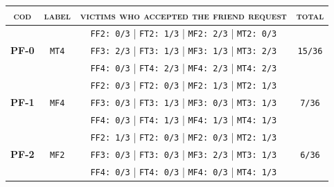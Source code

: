 \begin{table}[H]
	\begin{center}
		\begin{tabular}[c]{ |c|c|c|c|} 
			\hline
			\cellcolor[HTML]{b0d7ff}\textsc{cod} & 
			\cellcolor[HTML]{b0d7ff}\textsc{label}& 
			\cellcolor[HTML]{b0d7ff}\textsc{victims who accepted the friend request}&		
			\cellcolor[HTML]{b0d7ff}\textsc{total}\\
			\hline 
\multirow{3}{*}{\textbf{PF-0}} & \multirow{3}{*}{\texttt{MT4}}
&   \texttt{FF2: 0/3}  |  \texttt{FT2: 1/3}  |  \texttt{MF2: 2/3}  |  \texttt{MT2: 0/3} & \multirow{3}{*}{\texttt{15/36}} \\
& & \texttt{FF3: 2/3}  |  \texttt{FT3: 1/3}  |  \texttt{MF3: 1/3}  |  \texttt{MT3: 2/3} & \\
& & \texttt{FF4: 0/3}  |  \texttt{FT4: 2/3}  |  \texttt{MF4: 2/3}  |  \texttt{MT4: 2/3} & \\
\hline
\multirow{3}{*}{\textbf{PF-1}} & \multirow{3}{*}{\texttt{MF4}}
&   \texttt{FF2: 0/3}  |  \texttt{FT2: 0/3}  |  \texttt{MF2: 1/3}  |  \texttt{MT2: 1/3} & \multirow{3}{*}{\texttt{7/36}} \\
& & \texttt{FF3: 0/3}  |  \texttt{FT3: 1/3}  |  \texttt{MF3: 0/3}  |  \texttt{MT3: 1/3} & \\
& & \texttt{FF4: 0/3}  |  \texttt{FT4: 1/3}  |  \texttt{MF4: 1/3}  |  \texttt{MT4: 1/3} & \\
\hline
\multirow{3}{*}{\textbf{PF-2}} & \multirow{3}{*}{\texttt{MF2}}
&   \texttt{FF2: 1/3}  |  \texttt{FT2: 0/3}  |  \texttt{MF2: 0/3}  |  \texttt{MT2: 1/3} & \multirow{3}{*}{\texttt{6/36}} \\
& & \texttt{FF3: 0/3}  |  \texttt{FT3: 0/3}  |  \texttt{MF3: 2/3}  |  \texttt{MT3: 1/3} & \\
& & \texttt{FF4: 0/3}  |  \texttt{FT4: 0/3}  |  \texttt{MF4: 0/3}  |  \texttt{MT4: 1/3} & \\
\hline


\end{tabular}
\end{center}
\end{table}
